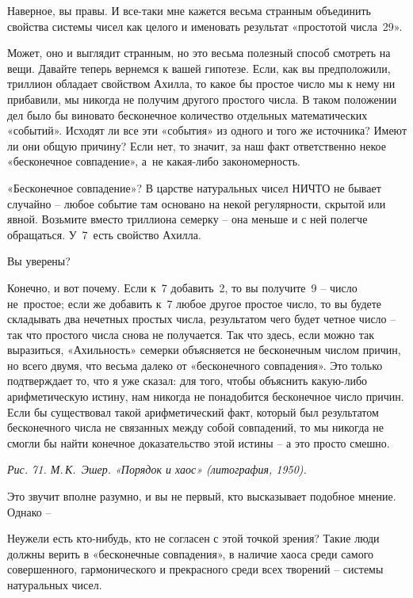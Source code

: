 \documentclass[../main.tex]{subfiles}
\begin{document}
\begin{dialogue}
 Наверное, вы правы. И все-таки мне кажется весьма странным объединить свойства системы чисел как целого и именовать результат «простотой числа~29».

 Может, оно и выглядит странным, но это весьма полезный способ смотреть на вещи. Давайте теперь вернемся к вашей гипотезе. Если, как вы предположили, триллион обладает свойством Ахилла, то какое бы простое число мы к нему ни прибавили, мы никогда не получим другого простого числа. В таком положении дел было бы виновато бесконечное количество отдельных математических «событий». Исходят ли все эти «события» из одного и того же источника? Имеют ли они общую причину? Если нет, то значит, за наш факт ответственно некое «бесконечное совпадение», а~не какая-либо закономерность.

 «Бесконечное совпадение»? В царстве натуральных чисел НИЧТО не бывает случайно \--- любое событие там основано на некой регулярности, скрытой или явной. Возьмите вместо триллиона семерку \--- она меньше и с ней полегче обращаться. У~7~есть свойство Ахилла.

 Вы уверены?

 Конечно, и вот почему. Если к~7 добавить~2, то вы получите~9 \--- число не~простое; если же добавить к~7 любое другое простое число, то вы будете складывать два нечетных простых числа, результатом чего будет четное число \--- так что простого числа снова не получается. Так что здесь, если можно так выразиться, «Ахильность» семерки объясняется не бесконечным числом причин, но всего двумя, что весьма далеко от «бесконечного совпадения». Это только подтверждает то, что я уже сказал: для того, чтобы объяснить какую-либо арифметическую истину, нам никогда не понадобится бесконечное число причин. Если бы существовал такой арифметический факт, который был результатом бесконечного числа не связанных между собой совпадений, то мы никогда не смогли бы найти конечное доказательство этой истины \--- а это просто смешно.

\emph{Рис. 71. М.\,К.~Эшер. «Порядок и хаос» (литография, 1950).}

 Это звучит вполне разумно, и вы не первый, кто высказывает подобное мнение. Однако \---

 Неужели есть кто-нибудь, кто не согласен с этой точкой зрения? Такие люди должны верить в «бесконечные совпадения», в наличие хаоса среди самого совершенного, гармонического и прекрасного среди всех творений \--- системы натуральных чисел.


\end{dialogue}
\end{document}
